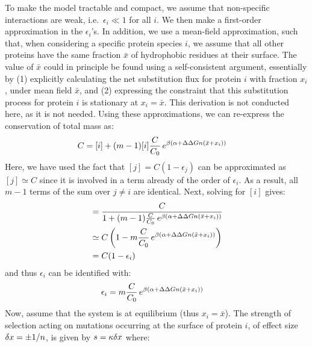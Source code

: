 To make the model tractable and compact, we assume that non-specific interactions are weak, i.e.~$\epsilon_i \ll 1$ for all $i$.
We then make a first-order approximation in the $\epsilon_i$'s.
In addition, we use a mean-field approximation, such that, when considering a specific protein species $i$, we assume that all other proteins have the same fraction $\bar x$ of hydrophobic residues at their surface.
The value of $\bar x$ could in principle be found using a self-consistent argument, essentially by (1) explicitly calculating the net substitution flux for protein $i$ with fraction $x_i$, under mean field $\bar x$, and (2) expressing the constraint that this substitution process for protein $i$ is stationary at $x_i = \bar x$.
This derivation is not conducted here, as it is not needed.
Using these approximations, we can re-express the conservation of total mass as:
\begin{align}
    C & = [i] + (m-1) [i] \frac{C}{C_0} \, e^{\beta (\alpha + \Delta \Delta G n (\bar x + x_i))}
\end{align}
Here, we have used the fact that $[j] = C(1 - \epsilon_j)$ can be approximated as $[j] \simeq C$ since it is involved in a term already of the order of $\epsilon_i$. As a result, all $m-1$ terms of the sum over $j\neq i$ are identical.
Next, solving for $[i]$ gives:
\begin{align}
[i]
    & = \frac{C} {1 + (m-1) \frac{C}{C_0} \, e^{\beta (\DeltaGmin + \DeltaDeltaG \NbrSites (\bar x + x_i))}}
    \\ & \simeq C \left( 1 - m \frac{C}{C_0} \, e^{\beta (\DeltaGmin + \DeltaDeltaG \NbrSites (\bar x + x_i))} \right)
    \\ & =
    C (1 - \epsilon_i)
\end{align}
and thus $\epsilon_i$ can be identified with:
\begin{align}
    \epsilon_i  & = m \frac{C}{C_0} \, e^{\beta (\alpha +\Delta \Delta G n (\bar x + x_i))}
\end{align}
Now, assume that the system is at equilibrium (thus $x_i = \bar x$).
The strength of selection acting on mutations occurring at the surface of protein $i$, of effect size $\delta x = \pm 1/n$, is given by $s = \kappa \delta x$ where:


